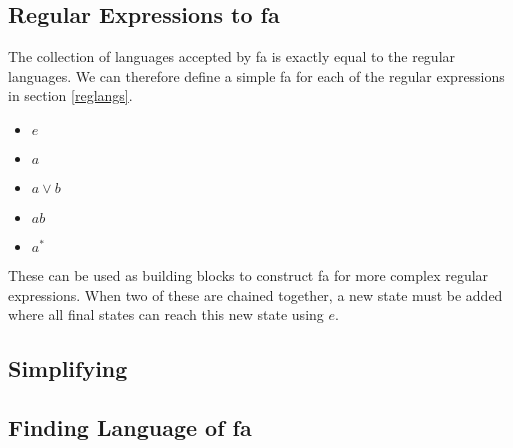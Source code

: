 \documentclass{article}
\begin{document}
		\subsection{Regular Expressions to fa}
			The collection of languages accepted by fa is exactly equal to the regular languages. We can therefore define a simple fa for each of the regular expressions in section \ref{reglangs}. \\
			\begin{itemize}
				\item $e$ \\
				\item $a$
				\item $a \lor b$
				\item $ab$
				\item $a^*$
			\end{itemize}
			These can be used as building blocks to construct fa for more complex regular expressions. When two of these are chained together, a new state must be added where all final states can reach this new state using $e$.
		\subsection{Simplifying}
		
		\subsection{Finding Language of fa}
	
\end{document}
